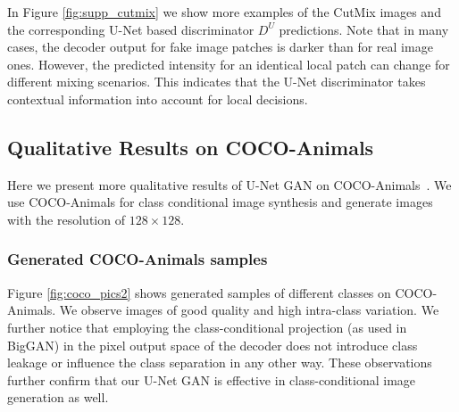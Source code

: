 \documentclass[10pt,twocolumn,letterpaper]{article}
\begin{document}
\begin{figure*}
\begin{centering}
\begin{tabular}{@{\hskip -0.2in}c@{ }c@{ }c@{ }c@{ }c@{ }c@{}c@{ }c@{ }c@{ }c@{ }c@{}}
				\end{tabular}


	\par\end{centering}

	\vspace{0.5em}

	\caption{\label{fig:supp_cutmix}  Visualization of the CutMix augmentation and the predictions of the U-Net discriminator on CutMix images. 1st row: real and fake samples. 2nd\&3rd rows: sampled real/fake CutMix ratio $r$ and corresponding binary masks $\mathrm{M}$ (color code: white for real, black for fake). 4th row: generated CutMix images from real and fake samples. 5th\&6th row: the corresponding real/fake segmentation maps of the U-Net GAN decoder $D^U_{dec}$ with the corresponding predicted classification scores by the encoder $D^U_{enc}$ below. 
	 }
\end{figure*}
 In Figure \ref{fig:supp_cutmix} we show more examples of the CutMix images and the corresponding U-Net based discriminator $D^U$ predictions. Note that in many cases, the decoder output for fake image patches is darker than for real image ones. However, the predicted intensity for an identical local patch can change for different mixing scenarios. This indicates that the U-Net discriminator takes contextual information into account for local decisions.

 \clearpage
\subsection{Qualitative Results on COCO-Animals}\label{sec:syn samples_coco}


Here we present more qualitative results of U-Net GAN on COCO-Animals~\cite{Lin2014MicrosoftCC,OpenImages}.
We use COCO-Animals for class conditional image synthesis and generate images with the resolution of $128\times 128$.

\subsubsection*{Generated COCO-Animals samples}
Figure \ref{fig:coco_pics2} shows generated samples of different classes on COCO-Animals. We observe images of good quality and high intra-class variation. We further notice that employing the class-conditional projection (as used in BigGAN) in the pixel output space of the decoder does not introduce class leakage or influence the class separation in any other way. 
These observations further confirm that our U-Net GAN is effective in class-conditional image generation as well.
\end{document}
